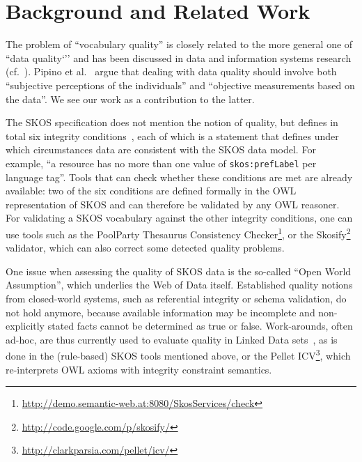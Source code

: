 
\section{Background and Related Work}\label{sec:background}

The problem of ``vocabulary quality'' is closely related to the more general one of ``data quality`'' and has been discussed in data and information systems research (cf.~\cite{Batini2009}). Pipino et al.~\cite{Pipino2002} argue that dealing with data quality should involve both ``subjective perceptions of the individuals'' and ``objective measurements based on the data''. We see our work as a contribution to the latter.

The SKOS specification does not mention the notion of quality, but defines in total six integrity conditions~\cite{SkosReference2008}, each of which is a statement that defines under which circumstances data are consistent with the SKOS data model. For example, ``a resource has no more than one value of \texttt{skos:prefLabel} per language tag''. Tools that can check whether these conditions are met are already available: two of the six conditions are defined formally in the OWL representation of SKOS and can therefore be validated by any OWL reasoner. For validating a SKOS vocabulary against the other integrity conditions, one can use tools such as the PoolParty Thesaurus Consistency Checker\footnote{\url{http://demo.semantic-web.at:8080/SkosServices/check}}, or the Skosify\footnote{\url{http://code.google.com/p/skosify/}} validator, which can also correct some detected quality problems.

One issue when assessing the quality of SKOS data is the so-called ``Open World Assumption'', which underlies the Web of Data itself. Established quality notions from closed-world systems, such as referential integrity or schema validation, do not hold anymore, because available information may be incomplete and non-explicitly stated facts cannot be determined as true or false. Work-arounds, often ad-hoc, are thus currently used to evaluate quality in Linked Data sets~\cite{Heath2011}, as is done in the (rule-based) SKOS tools mentioned above, or the Pellet ICV\footnote{\url{http://clarkparsia.com/pellet/icv/}}, which re-interprets OWL axioms with integrity constraint semantics.



